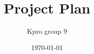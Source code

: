 \documentclass[a4paper, 11pt]{report}
\title{Project Plan}
\author{Kpro group 9}
\date{\today}
\begin{document}
\makeglossaries




\end{document}
